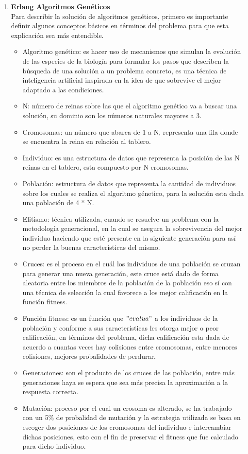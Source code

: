 \documentclass[12pt,a4paper]{article}
\begin{document}
\begin{enumerate}
\pagebreak
\item  \textbf{Erlang Algoritmos Genéticos} \\

Para describir la solución de algoritmos genéticos, primero es importante definir algunos conceptos básicos en términos del problema para que esta explicación sea más entendible. 
\begin{itemize}
\item Algoritmo genético: es hacer uso de mecanismos que simulan la evolución de las especies de la biología para formular los pasos que describen la búsqueda de una solución a un problema concreto, es una técnica de inteligencia artificial inspirada en la idea de que sobrevive el mejor adaptado a las condiciones.
\item N: número de reinas sobre las que el algoritmo genético va a buscar una solución, su dominio son los números naturales mayores a 3.
\item Cromosomas: un número que abarca de 1 a N, representa una fila donde se encuentra la reina en relación al tablero.
\item Individuo: es una estructura de datos que representa la posición de las N reinas en el tablero, esta compuesto por N cromosomas.
\item Población: estructura de datos que representa la cantidad de individuos sobre los cuales se realiza el algoritmo génetico, para la solución esta dada una población de 4 * N.
\item Elitismo: técnica utilizada, cuando se resuelve un problema con la metodología generacional, en la cual se asegura la sobrevivencia del mejor individuo haciendo que esté presente en la siguiente generación para así no perder la buenas caracteristicas del mismo. 
\item Cruces: es el proceso en el cuál los individuos de una población se cruzan para generar una nueva generación, este cruce está dado de forma aleatoria entre los miembros de la población de la población eso sí con una técnica de selección la cual favorece a los mejor calificación en la función fitness.
\item Función fitness: es un función que $"evalua"$ a los individuos de la población y conforme a sus características les otorga mejor o peor calificación, en términos del problema, dicha calificación esta dada de acuerdo a cuantas veces hay colisiones entre cromosomas, entre menores colisiones, mejores probalidades de perdurar. 
\item Generaciones: son el producto de los cruces de las población, entre más generaciones haya se espera que sea más precisa la aproximación a la respuesta correcta.
\item Mutación: proceso por el cual un crosoma es alterado, se ha trabajado con un 5\% de probalidad de mutación y la estrategia utilizada se basa en escoger dos posiciones de los cromosomas del individuo e intercambiar dichas posiciones, esto con el fin de preservar el fitness que fue calculado para dicho individuo.
\end{itemize}
\end{enumerate}
\pagebreak
\end{document}
